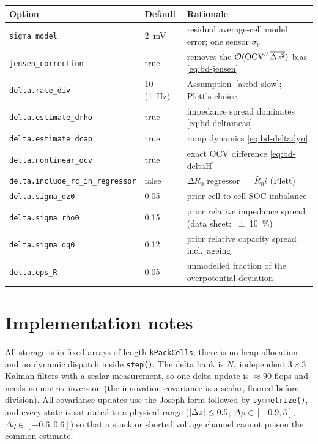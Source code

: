 \begin{center}\small
\begin{tabular}{@{}lll@{}}
\toprule
Option & Default & Rationale \\
\midrule
\texttt{sigma\_model} & \SI{2}{\milli\volt} & residual average-cell model error; one sensor $\sigma_v$ \\
\texttt{jensen\_correction} & true & removes the $\mathcal{O}(\mathrm{OCV}''\,\overline{\Delta z^2})$ bias \eqref{eq:bd-jensen} \\
\texttt{delta.rate\_div} & 10 (\SI{1}{\hertz}) & Assumption~\ref{as:bd-slow}; Plett's choice \cite{plett2009bardelta} \\
\texttt{delta.estimate\_drho} & true & impedance spread dominates \eqref{eq:bd-deltameas} \\
\texttt{delta.estimate\_dcap} & true & ramp dynamics \eqref{eq:bd-deltadyn} \\
\texttt{delta.nonlinear\_ocv} & true & exact OCV difference \eqref{eq:bd-deltaH} \\
\texttt{delta.include\_rc\_in\_regressor} & false & $\Delta R_0$ regressor $=\bar R_0 i$ (Plett) \\
\texttt{delta.sigma\_dz0} & 0.05 & prior cell-to-cell SOC imbalance \\
\texttt{delta.sigma\_rho0} & 0.15 & prior relative impedance spread (data sheet: \SI{\pm 10}{\percent}) \\
\texttt{delta.sigma\_dq0} & 0.12 & prior relative capacity spread incl.\ ageing \\
\texttt{delta.eps\_R} & 0.05 & unmodelled fraction of the overpotential deviation \\
\bottomrule
\end{tabular}
\end{center}

\section{Implementation notes}
All storage is in fixed arrays of length \texttt{kPackCells}; there is no heap allocation and no
dynamic dispatch inside \texttt{step()}. The delta bank is $N_c$ independent $3\times3$ Kalman
filters with a scalar measurement, so one delta update is $\approx\num{90}$ flops and needs no
matrix inversion (the innovation covariance is a scalar, floored before division). All covariance
updates use the Joseph form followed by \texttt{symmetrize()}, and every state is saturated to a
physical range ($|\Delta z|\le0.5$, $\Delta\rho\in[-0.9,3]$, $\Delta q\in[-0.6,0.6]$) so that a
stuck or shorted voltage channel cannot poison the common estimate.

